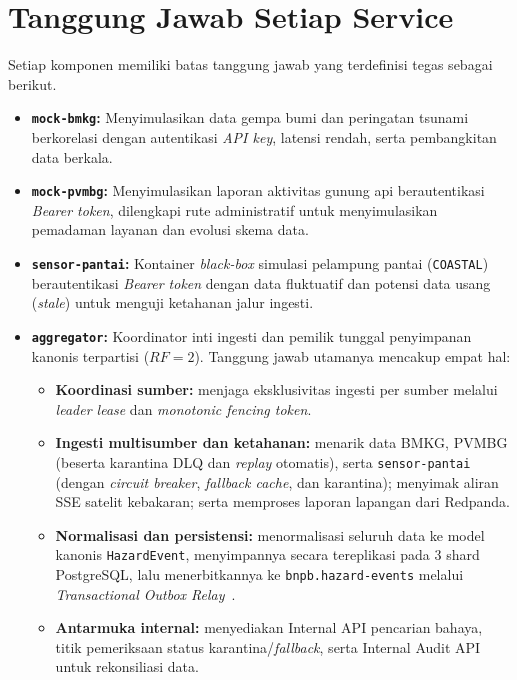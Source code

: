 \section{Tanggung Jawab Setiap Service}
Setiap komponen memiliki batas tanggung jawab yang terdefinisi tegas sebagai berikut.

\begin{itemize}
    \item \textbf{\texttt{mock-bmkg}:} Menyimulasikan data gempa bumi dan peringatan tsunami berkorelasi dengan autentikasi \textit{API key}, latensi rendah, serta pembangkitan data berkala.
    \item \textbf{\texttt{mock-pvmbg}:} Menyimulasikan laporan aktivitas gunung api berautentikasi \textit{Bearer token}, dilengkapi rute administratif untuk menyimulasikan pemadaman layanan dan evolusi skema data.
    \item \textbf{\texttt{sensor-pantai}:} Kontainer \textit{black-box} simulasi pelampung pantai (\texttt{COASTAL}) berautentikasi \textit{Bearer token} dengan data fluktuatif dan potensi data usang (\textit{stale}) untuk menguji ketahanan jalur ingesti.
    \item \textbf{\texttt{aggregator}:} Koordinator inti ingesti dan pemilik tunggal penyimpanan kanonis terpartisi ($RF=2$). Tanggung jawab utamanya mencakup empat hal:
    \begin{itemize}
        \item \textbf{Koordinasi sumber:} menjaga eksklusivitas ingesti per sumber melalui \textit{leader lease} dan \textit{monotonic fencing token}.
        \item \textbf{Ingesti multisumber dan ketahanan:} menarik data BMKG, PVMBG (beserta karantina DLQ dan \textit{replay} otomatis), serta \texttt{sensor-pantai} (dengan \textit{circuit breaker}, \textit{fallback cache}, dan karantina); menyimak aliran SSE satelit kebakaran; serta memproses laporan lapangan dari Redpanda.
        \item \textbf{Normalisasi dan persistensi:} menormalisasi seluruh data ke model kanonis \texttt{HazardEvent}, menyimpannya secara tereplikasi pada 3 shard PostgreSQL, lalu menerbitkannya ke \texttt{bnpb.hazard-events} melalui \textit{Transactional Outbox Relay}~\cite{richardson2018microservices}.
        \item \textbf{Antarmuka internal:} menyediakan Internal API pencarian bahaya, titik pemeriksaan status karantina/\textit{fallback}, serta Internal Audit API untuk rekonsiliasi data.
    \end{itemize}

\end{itemize}
